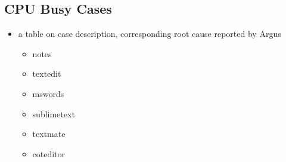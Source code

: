 
\subsection{CPU Busy Cases}
\begin{itemize}
\item  a table on case description, corresponding root cause reported by Argus
	\begin{itemize}
	\item notes
	\item textedit
	\item mswords
	\item sublimetext
	\item textmate
	\item coteditor
	\end{itemize}
\end{itemize}
